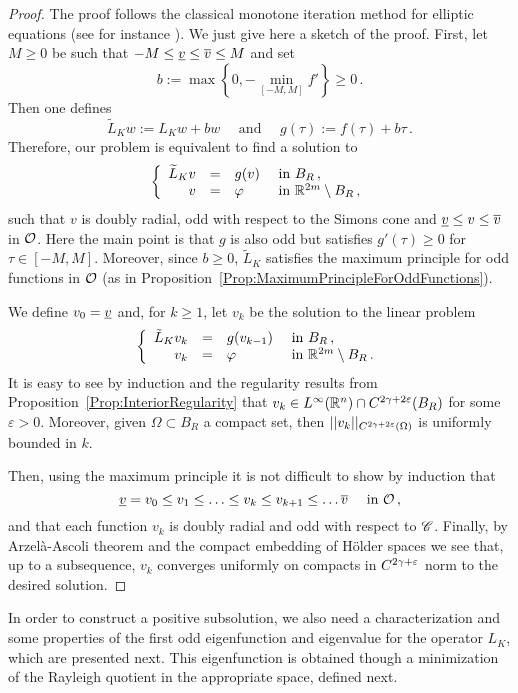 \begin{proof}
	The proof follows the classical monotone iteration method for elliptic equations (see for instance \cite{Evans}). We just give here a sketch of the proof. 
	First, let $M \geq 0$ be such that $-M \leq \underline{v} \leq \overline{v} \leq M$ and set
	$$
	b := \max \left \{{0, - \min_{[-M,M]}f'}\right \}\geq 0\,.
	$$
	Then one defines 
	$$
	\widetilde{L}_K w := L_Kw + b w 	\quad \text{ and } \quad 	g(\tau) := f(\tau) + b \tau\,.
	$$
	Therefore, our problem is equivalent to find a solution to
	$$
	\left\{\begin{array}{rcll}
	\widetilde{L}_Kv & = & g(v) & \textrm{ in } B_R\,, \\
	v &=& \varphi &  \textrm{ in } \mathbb{R}^{2m} \setminus B_R\,, 
	\end{array} \right.
	$$
	such that $v$ is doubly radial, odd with respect to the Simons cone and  $\underline{v} \leq v \leq \overline{v}$ in $\mathcal{O}$. Here the main point is that $g$ is also odd but satisfies $g'(\tau) \geq 0$ for $\tau \in [-M,M]$. Moreover, since $b \geq 0$, $\widetilde{L}_K$ satisfies the maximum principle for odd functions in $\mathcal{O}$ (as in Proposition~\ref{Prop:MaximumPrincipleForOddFunctions}).
	
	We define $v_0 = \underline{v}$ and, for $k\geq 1$, let $v_k$ be the solution to the linear problem
	$$
	\left\{\begin{array}{rcll}
	\tilde{L}_K v_k & = & g(v_{k-1}) & \textrm{ in } B_R\,, \\
	v_k &=& \varphi &  \textrm{ in } \mathbb{R}^{2m} \setminus B_R\,. 
	\end{array} \right.
	$$
	It is easy to see by induction and the regularity results from Proposition~\ref{Prop:InteriorRegularity} that $v_k\in L^\infty(\mathbb{R}^n) \cap C^{2\gamma+2\varepsilon}(B_R)$ for some $\varepsilon>0$. Moreover, given $\Omega\subset B_R$ a compact set, then $||v_k||_{C^{2\gamma+2\varepsilon}(\Omega)}$ is uniformly bounded in $k$.
	
	Then, using the maximum principle it is not difficult to show by induction that 
	$$
	\underline{v} = v_0 \leq v_1 \leq \ldots \leq v_k \leq v_{k+1} \leq \ldots \overline{v} \quad \text{ in }\mathcal{O}\,,
	$$
	and that each function $v
	_k$ is doubly radial and odd with respect to $\mathscr{C}$. Finally, by Arzelà-Ascoli theorem and the compact embedding of H\"older spaces we see that, up to a subsequence, $v_k$ converges uniformly on compacts in $C^{2\gamma+\varepsilon}$ norm to the desired solution.
\end{proof}

In order to construct a positive subsolution, we also need a characterization and some properties of the first odd eigenfunction and eigenvalue for the operator $L_K$, which are presented next. This eigenfunction is obtained though a minimization of the Rayleigh quotient in the appropriate space, defined next.

